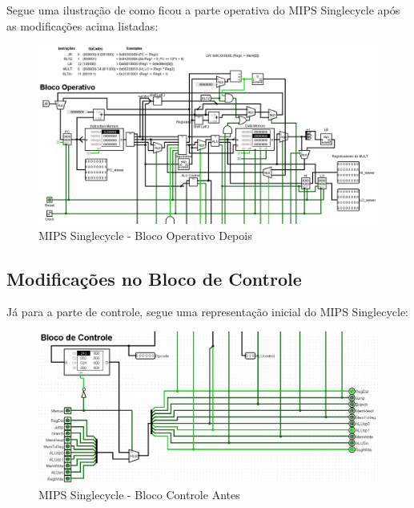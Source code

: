 \documentclass{report}
\begin{document}
        \clearpage
        Segue uma ilustração de como ficou a parte operativa do MIPS Singlecycle após as modificações acima listadas:
        \begin{figure}[h!]
            \centering
            \includegraphics[width=\linewidth]{images/prints/Monocycle/Bloco Operativo Monocycle Depois.png}
            \caption{\label{print:singlecycle_ob_after} MIPS Singlecycle - Bloco Operativo Depois}
        \end{figure}

        \subsection{Modificações no Bloco de Controle}
        Já para a parte de controle, segue uma representação inicial do MIPS Singlecycle:
        \begin{figure}[h!]
            \centering
            \includegraphics[width=\linewidth]{images/prints/Monocycle/Bloco de Controle Monocycle Antes.png}
            \caption{\label{print:singlecycle_cb_before} MIPS Singlecycle - Bloco Controle Antes}
        \end{figure}
\end{document}

